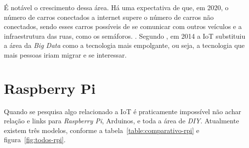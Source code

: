 \documentclass[
	12pt,				%
	openright,			%
	oneside,			%
	a4paper,			%
	chapter=TITLE,		%
	english,			%
	brazil				%
	]{abntex2}
\begin{document}
{É notável o crescimento dessa área. Há uma expectativa de que, em 2020, o número de carros conectados a internet supere o número de carros não conectados, sendo esses carros possíveis de se comunicar com outros veículos e a infraestrutura das ruas, como os semáforos. \cite{goldmansachs-iot}. Segundo , em 2014 a IoT substituiu a área da \textit{Big Data} como a tecnologia mais empolgante, ou seja, a tecnologia que mais pessoas iriam migrar e se interessar. 


\section{Raspberry Pi}

Quando se pesquisa algo relacionado a IoT é praticamente impossível não achar relação e links para \textit{Raspberry Pi}, Arduinos, e toda a área de \textit{DIY}. Atualmente existem três modelos, conforme a tabela~\ref{table:comparativo-rpi} e figura~\ref{fig:todos-rpi}. 

\begin{figure}[h!]
\end{figure}


\begin{table}[htb]
\end{table}

}
\end{document}
